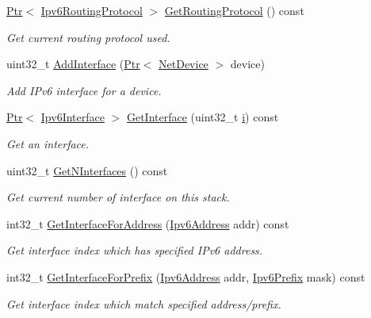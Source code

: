 \begin{DoxyCompactItemize}
\hyperlink{classns3_1_1Ptr}{Ptr}$<$ \hyperlink{classns3_1_1Ipv6RoutingProtocol}{Ipv6\+Routing\+Protocol} $>$ \hyperlink{classns3_1_1Ipv6L3Protocol_aea90446045bb78b99b150ef1dd9afdb4}{Get\+Routing\+Protocol} () const 
\begin{DoxyCompactList}\small\item\em Get current routing protocol used. \end{DoxyCompactList}\item 
uint32\+\_\+t \hyperlink{classns3_1_1Ipv6L3Protocol_a56047c2ee7db15185af07538c609cbb5}{Add\+Interface} (\hyperlink{classns3_1_1Ptr}{Ptr}$<$ \hyperlink{classns3_1_1NetDevice}{Net\+Device} $>$ device)
\begin{DoxyCompactList}\small\item\em Add I\+Pv6 interface for a device. \end{DoxyCompactList}\item 
\hyperlink{classns3_1_1Ptr}{Ptr}$<$ \hyperlink{classns3_1_1Ipv6Interface}{Ipv6\+Interface} $>$ \hyperlink{classns3_1_1Ipv6L3Protocol_a2e53b72d76bceb713f2d3cb54e24f5a1}{Get\+Interface} (uint32\+\_\+t \hyperlink{lte__uplink__power__control_8m_a6f6ccfcf58b31cb6412107d9d5281426}{i}) const 
\begin{DoxyCompactList}\small\item\em Get an interface. \end{DoxyCompactList}\item 
uint32\+\_\+t \hyperlink{classns3_1_1Ipv6L3Protocol_a53882c40f6fb32e2a6fe0a7a2858698d}{Get\+N\+Interfaces} () const 
\begin{DoxyCompactList}\small\item\em Get current number of interface on this stack. \end{DoxyCompactList}\item 
int32\+\_\+t \hyperlink{classns3_1_1Ipv6L3Protocol_ae8d652431e374e8b05425ae9e1bf0f1b}{Get\+Interface\+For\+Address} (\hyperlink{classns3_1_1Ipv6Address}{Ipv6\+Address} addr) const 
\begin{DoxyCompactList}\small\item\em Get interface index which has specified I\+Pv6 address. \end{DoxyCompactList}\item 
int32\+\_\+t \hyperlink{classns3_1_1Ipv6L3Protocol_ad6454a2718ec03a97ff11a29bc015ef2}{Get\+Interface\+For\+Prefix} (\hyperlink{classns3_1_1Ipv6Address}{Ipv6\+Address} addr, \hyperlink{classns3_1_1Ipv6Prefix}{Ipv6\+Prefix} mask) const 
\begin{DoxyCompactList}\small\item\em Get interface index which match specified address/prefix. \end{DoxyCompactList}\item 

\end{DoxyCompactItemize}
